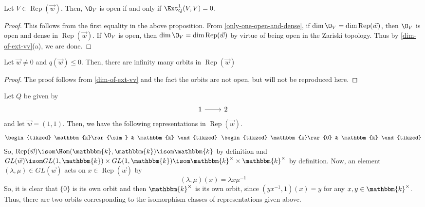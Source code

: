 \documentclass[11pt,leqno,oneside]{amsbook}
\numberwithin{thm}{section}
\newcommand{\bbk}{\mathbbm{k}} %
\newcommand{\Rep}{\operatorname{Rep}} %
\renewcommand{\Q}{Q} %
\begin{document}
\begin{prop}
  Let \(V \in \Rep(\vec{w})\). Then, \(\O_V\) is open if and only if
  \(\Ext_\Q^1(V,V) = 0\). 
\end{prop}
\begin{proof}
  This follows from the first equality in the above proposition. From
  \ref{only-one-open-and-dense}, if \(\dim \O_V = \dim
  \Rep(\vec{w})\), then \(\O_V\) is open and dense in
  \(\Rep(\vec{w})\). If \(\O_V\) is open, then \(\dim \O_V = \dim
  \Rep(\vec{w})\) by virtue of being open in the Zariski
  topology. Thus by \ref{dim-of-ext-vv}(a), we are done.
\end{proof}
\begin{prop}
  Let \(\vec{w} \neq 0\) and \(q(\vec{w}) \leq 0\). Then, there are
  infinity many orbits in \(\Rep(\vec{w})\)
\end{prop}
\begin{proof}
  The proof follows from \ref{dim-of-ext-vv} and the fact the orbits
  are not open, but will not be reproduced here. 
\end{proof}
\begin{example}
  Let \(\Q\) be given by \[
    \begin{tikzcd}
      1 \rar & 2
    \end{tikzcd}
  \]
  and let \(\vec{w} = (1,1)\). Then, we have the following
  representations in \(\Rep(\vec{w})\). \[
    \begin{tikzcd}
      \bbk \rar{\sim} & \bbk
    \end{tikzcd} \ \
    \begin{tikzcd}
      \bbk \rar{0} & \bbk
    \end{tikzcd}
  \]
  So, \(\Rep(\vec{w}) \isom \Hom(\bbk, \bbk) \isom \bbk\) by
  definition and \(GL(\vec{w}) \isom GL(1,\bbk) \times GL(1, \bbk)
  \isom \bbk^\times \times \bbk^\times\) by definition. Now, an
  element \((\lambda,\mu) \in GL(\vec{w})\) acts on \(x \in
  \Rep(\vec{w})\) by \[
    (\lambda,\mu)(x) = \lambda x \mu^{-1}
  \]
  So, it is clear that \(\{0\}\) is its own orbit and then
  \(\bbk^\times\) is its own orbit, since \((yx^{-1},1)(x) = y\) for
  any \(x,y \in \bbk^\times\). Thus, there are two orbits
  corresponding to the isomorphism classes of representations given
  above.
\end{example}
\end{document}
